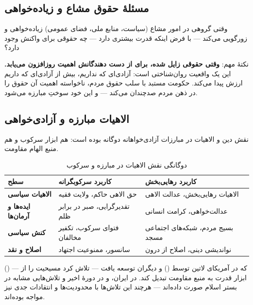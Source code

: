 \subsection{مسئلهٔ حقوق مشاع و زیاده‌خواهی}

\begin{tcolorbox}[warnbox, title={\textbf{چالش در حقوق مشاع}}]
وقتی گروهی در امور مشاع (سیاست، منابع ملی، فضای عمومی) زیاده‌خواهی و 
زورگویی می‌کند — با فرض اینکه قدرت بیشتری دارد — چه حقوقی برای واکنش 
وجود دارد؟

نکتهٔ مهم: \textbf{وقتی حقوقی زایل شده، برای از دست دهندگانش اهمیت 
روزافزون می‌یابد.} این یک واقعیت روان‌شناختی است: آزادی‌ای که نداریم، 
بیش از آزادی‌ای که داریم ارزش پیدا می‌کند. حکومت مستبد با سلب حقوق مردم، 
ناخواسته اهمیت آن حقوق را در ذهن مردم صدچندان می‌کند — و این خود سوختِ 
مبارزه می‌شود.
\end{tcolorbox}

\subsection{الاهیات مبارزه و آزادی‌خواهی}

نقش دین و الاهیات در مبارزات آزادی‌خواهانه دوگانه بوده است: هم ابزار 
سرکوب و هم منبع الهام مقاومت. 

\begin{table}[htbp]
\centering
\small
\begin{tabularx}{\linewidth}{|>{\raggedleft\bfseries}p{3cm}|X|X|}
\hline
\rowcolor{BgCool}
\textbf{سطح} & \textbf{کاربرد سرکوبگرانه} & \textbf{کاربرد رهایی‌بخش} \\
\hline
الاهیات سیاسی & حق الاهی حاکم، ولایت فقیه & الاهیات رهایی‌بخش، عدالت 
الاهی \\
\hline
ایده‌ها و آرمان‌ها & تقدیرگرایی، صبر در برابر ظلم & عدالت‌خواهی، کرامت 
انسانی \\
\hline
کنش سیاسی & فتوای سرکوب، تکفیر مخالفان & بسیج مردم، شبکه‌های اجتماعی 
مسجد \\
\hline
اصلاح و نقد & سانسور، ممنوعیت اجتهاد & نواندیشی دینی، اصلاح از درون \\
\hline
\end{tabularx}
\caption*{دوگانگی نقش الاهیات در مبارزه و سرکوب}
\end{table}

 () — که در آمریکای 
لاتین توسط  () و دیگران 
توسعه یافت — تلاش کرد مسیحیت را از ابزار قدرت به منبع مقاومت تبدیل کند. 
در ایران،  و در دورهٔ اخیر  
و  تلاش‌هایی مشابه در بستر اسلام صورت داده‌اند — 
هرچند این تلاش‌ها با محدودیت‌ها و انتقادات جدی نیز مواجه بوده‌اند.

